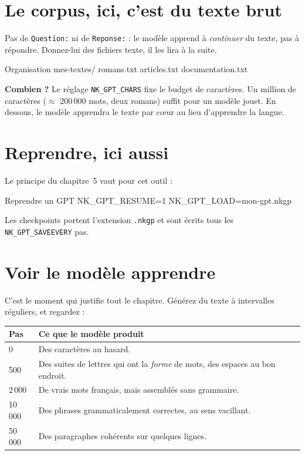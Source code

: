 \section{Le corpus, ici, c'est du texte brut}

Pas de \texttt{Question:} ni de \texttt{Reponse:} : le modèle apprend à
\emph{continuer} du texte, pas à répondre. Donnez-lui des fichiers texte, il les
lira à la suite.

\begin{nkcode}[]{Organisation}
mes-textes/
  romans.txt
  articles.txt
  documentation.txt
\end{nkcode}

\textbf{Combien ?} Le réglage \texttt{NK\_GPT\_CHARS} fixe le budget de
caractères. Un million de caractères ($\approx$ 200\,000 mots, deux romans)
suffit pour un modèle jouet. En dessous, le modèle apprendra le texte par cœur
au lieu d'apprendre la langue.

\section{Reprendre, ici aussi}

Le principe du chapitre~5 vaut pour cet outil :

\begin{nkcode}[]{Reprendre un GPT}
NK_GPT_RESUME=1
NK_GPT_LOAD=mon-gpt.nkgp
\end{nkcode}

Les checkpoints portent l'extension \texttt{.nkgp} et sont écrits tous les
\texttt{NK\_GPT\_SAVEEVERY} pas.

\section{Voir le modèle apprendre}

C'est le moment qui justifie tout le chapitre. Générez du texte à intervalles
réguliers, et regardez :

\begin{center}
\begin{tabular}{lp{10.0cm}}
\toprule
\textbf{Pas} & \textbf{Ce que le modèle produit} \\
\midrule
0 & Des caractères au hasard. \\
500 & Des suites de lettres qui ont la \emph{forme} de mots, des espaces au bon
      endroit. \\
2\,000 & De vrais mots français, mais assemblés sans grammaire. \\
10\,000 & Des phrases grammaticalement correctes, au sens vacillant. \\
50\,000 & Des paragraphes cohérents sur quelques lignes. \\
\bottomrule
\end{tabular}
\end{center}

